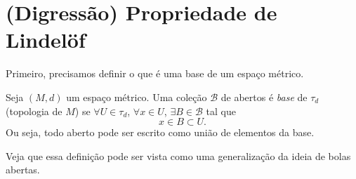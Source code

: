 
\section*{(Digressão) Propriedade de Lindelöf}

Primeiro, precisamos definir o que é uma base de um espaço métrico.
\begin{definition}
    Seja $\left( M,d \right) $ um espaço métrico. Uma coleção $\mathcal{B}$ de abertos é \emph{base} de $\tau_d$ (topologia de $M$) se $\forall U\in \tau_d$, $\forall x\in U$, $\exists B\in \mathcal{B}$ tal que \[
    x \in B \subset U
    .\] Ou seja, todo aberto pode ser escrito como união de elementos da base.
\end{definition}

\begin{note}
    Veja que essa definição pode ser vista como uma generalização da ideia de bolas abertas.
\end{note}

